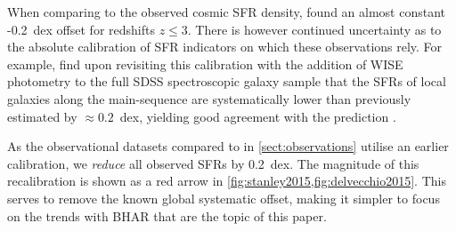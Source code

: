 When comparing to the observed cosmic SFR density, \citet{Furlong2015a} found an
almost constant -0.2~dex offset for redshifts $z \leq 3$.  There is however
continued uncertainty as to the absolute calibration of SFR indicators on which
these observations rely.  For example, \citet{Chang2015} find upon revisiting
this calibration with the addition of WISE photometry to the full SDSS
spectroscopic galaxy sample that the SFRs of local galaxies along the
main-sequence are systematically lower than previously estimated by $\approx
0.2$~dex, yielding good agreement with the \eagle prediction \citep[see Figure
5 of][]{Schaller2015b}.

As the observational datasets compared to in \cref{sect:observations} utilise
an earlier calibration, we \textit{reduce} all observed SFRs by 0.2~dex. The
magnitude of this recalibration is shown as a red arrow in
\cref{fig:stanley2015,fig:delvecchio2015}. This serves to remove the known
global systematic offset, making it simpler to focus on the trends with BHAR
that are the topic of this paper. 
